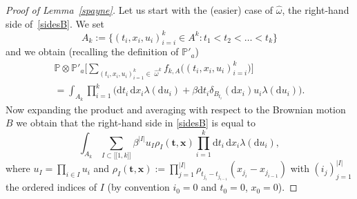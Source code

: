 \documentclass[10pt]{amsart}
\let\sep:
\newcommand{\lint}{\mathopen{[\![}}
\newcommand{\rint}{\mathclose{]\!]}}
\theoremstyle{definition}
\newcommand{\bt}{\boldsymbol{t}}
\newcommand{\bx}{\boldsymbol{x}}
\newcommand{\dd}{\mathrm{d}}
\newcommand{\bbP}{{\ensuremath{\mathbb P}} }
\let\go\omega
\begin{document}
\begin{proof}[Proof of Lemma~\ref{spayne}]
Let us start with the (easier) case of $\hat \go$, \ie the right-hand side of~\eqref{sidesB}.
We set
\[
A_k:= \bigl\{ (t_i,x_i,u_i)_{i=i}^k\in A^k \sep t_1<t_2<\dots<t_k \bigr\}
\]
and we obtain (recalling the definition of $\bbP'_a$)\vspace*{-5pt}
\begin{multline*}
\bbP\otimes \bbP'_a \bigg[ \sum_{(t_i,x_i,u_i)_{i=1}^k\in \; \hat \go^k} f_{k,A} \bigl((t_i,x_i,u_i)_{i=i}^k \bigr) \bigg]\\[-8pt]
= \int_{A_k} \prod_{i=1}^k\bigl(\dd t_i\,\dd x_i \lambda (\dd u_i) + \beta \dd t_i \delta_{B_{t_i}}(\dd x_i) u_i \lambda (\dd u_i) \bigr).
\end{multline*}
Now expanding the product and averaging with respect to the Brownian motion~$B$ we obtain that the
right-hand side in \eqref{sidesB} is equal to
\begin{equation}
\label{rhsofsides}
\int_{A_k} \sum_{I\subset\lint 1,k\rint}\beta^{|I|} u_I \rho_I(\bt,\bx) \prod_{i=1}^k \dd t_i\,\dd x_i \lambda (\dd u_i),
\end{equation}
where $u_I=\prod_{i\in I} u_i$ and $\rho_I(\bt, \bx):= \prod_{j=1}^{|I|} \rho_{t_{j_{i}}- t_{j_{i-1}}}(x_{j_{i}}-x_{j_{i-1}})$ with
$(i_j)_{j=1}^{|I|}$ the ordered indices of $I$ (by convention $i_0=0$ and $t_0=0$, $x_0=0$).


\end{proof}
\end{document}
